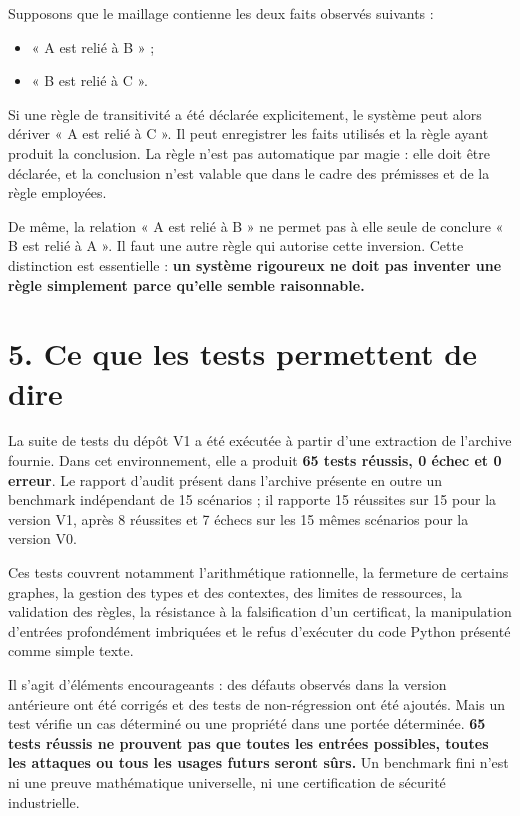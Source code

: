 \documentclass[11pt,a4paper]{article}
\newcommand{\important}[1]{\textbf{#1}}
\begin{document}
Supposons que le maillage contienne les deux faits observés suivants :
\begin{itemize}
  \item « A est relié à B » ;
  \item « B est relié à C ».
\end{itemize}

Si une règle de transitivité a été déclarée explicitement, le système peut alors dériver « A est relié à C ». Il peut enregistrer les faits utilisés et la règle ayant produit la conclusion. La règle n'est pas automatique par magie : elle doit être déclarée, et la conclusion n'est valable que dans le cadre des prémisses et de la règle employées.

De même, la relation « A est relié à B » ne permet pas à elle seule de conclure « B est relié à A ». Il faut une autre règle qui autorise cette inversion. Cette distinction est essentielle : \important{un système rigoureux ne doit pas inventer une règle simplement parce qu'elle semble raisonnable.}

\section*{5. Ce que les tests permettent de dire}

La suite de tests du dépôt V1 a été exécutée à partir d'une extraction de l'archive fournie. Dans cet environnement, elle a produit \important{65 tests réussis, 0 échec et 0 erreur}. Le rapport d'audit présent dans l'archive présente en outre un benchmark indépendant de 15 scénarios ; il rapporte 15 réussites sur 15 pour la version V1, après 8 réussites et 7 échecs sur les 15 mêmes scénarios pour la version V0.

Ces tests couvrent notamment l'arithmétique rationnelle, la fermeture de certains graphes, la gestion des types et des contextes, des limites de ressources, la validation des règles, la résistance à la falsification d'un certificat, la manipulation d'entrées profondément imbriquées et le refus d'exécuter du code Python présenté comme simple texte.

Il s'agit d'éléments encourageants : des défauts observés dans la version antérieure ont été corrigés et des tests de non-régression ont été ajoutés. Mais un test vérifie un cas déterminé ou une propriété dans une portée déterminée. \important{65 tests réussis ne prouvent pas que toutes les entrées possibles, toutes les attaques ou tous les usages futurs seront sûrs.} Un benchmark fini n'est ni une preuve mathématique universelle, ni une certification de sécurité industrielle.
\end{document}
